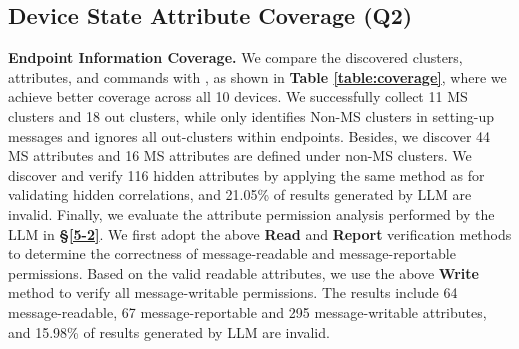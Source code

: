 \documentclass[10pt,journal,compsoc]{IEEEtran}
\begin{document}
\subsection{Device State Attribute Coverage (Q2)} \label{7-3}

\textbf{Endpoint Information Coverage.} We compare the discovered clusters, attributes, and commands with \textbf{{\color{Orange}{B4}}}, as shown in \textbf{Table \ref{table:coverage}}, where we achieve better coverage across all 10 devices. We successfully collect 11 MS clusters and 18 out clusters, while \textbf{{\color{Orange}{B4}}} only identifies Non-MS clusters in setting-up messages and ignores all out-clusters within endpoints. Besides, we discover 44 MS attributes and 16 MS attributes are defined under non-MS clusters. We discover and verify 116 hidden attributes by applying the same method as for validating hidden correlations, and 21.05\% of results generated by LLM are invalid. Finally, we evaluate the attribute permission analysis performed by the LLM in \textbf{\S\ref{5-2}}. We first adopt the above \textbf{Read} and \textbf{Report} verification methods to determine the correctness of message-readable and message-reportable permissions. Based on the valid readable attributes, we use the above \textbf{Write} method to verify all message-writable permissions. The results include 64 message-readable, 67 message-reportable and 295 message-writable attributes, and 15.98\% of results generated by LLM are invalid. 
\end{document}
